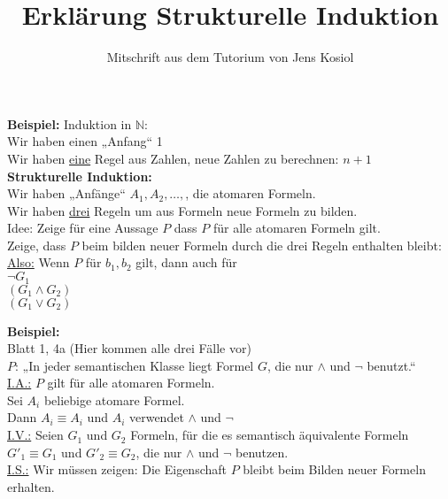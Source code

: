 \documentclass[a4paper]{scrartcl}
\begin{document}
\title{Erklärung Strukturelle Induktion}
\subtitle{Mitschrift aus dem Tutorium von Jens Kosiol}
\maketitle

\textbf{Beispiel:} Induktion in $\mathbb{N}$:\\
Wir haben einen „Anfang“ 1\\
Wir haben \underline{eine} Regel aus Zahlen, neue Zahlen zu berechnen: $n+1$\\


\textbf{Strukturelle Induktion:}\\
Wir haben „Anfänge“ $A_1, A_2, …, $, die atomaren Formeln.\\
Wir haben \underline{drei} Regeln um aus Formeln neue Formeln zu bilden.\\

Idee: Zeige für eine Aussage $P$ dass $P$ für alle atomaren Formeln gilt.\\

Zeige, dass $P$ beim bilden neuer Formeln durch die drei Regeln enthalten bleibt:\\

\underline{Also:} Wenn $P$ für $b_1, b_2$ gilt, dann auch für\\
$\neg G_1$\\
$(G_1 \wedge G_2)$\\
$(G_1 \vee G_2)$\\

\newpage

\textbf{Beispiel:}\\
Blatt 1, 4a (Hier kommen alle drei Fälle vor)\\
$P$: „In jeder semantischen Klasse liegt Formel $G$, die nur $\wedge$ und $\neg$ benutzt.“\\
\underline{I.A.:} $P$ gilt für alle atomaren Formeln.\\
Sei $A_i$ beliebige atomare Formel.\\

Dann $A_i \equiv A_i$ und $A_i$ verwendet $\wedge$ und $\neg$\\
\underline{I.V.:} Seien $G_1$ und $G_2$ Formeln, für die es semantisch äquivalente Formeln $G'_1 \equiv G_1$ und $G'_2 \equiv G_2$, die nur $\wedge$ und $\neg$ benutzen.\\
\underline{I.S.:} Wir müssen zeigen: Die Eigenschaft $P$ bleibt beim Bilden neuer Formeln erhalten.\\
\end{document}
